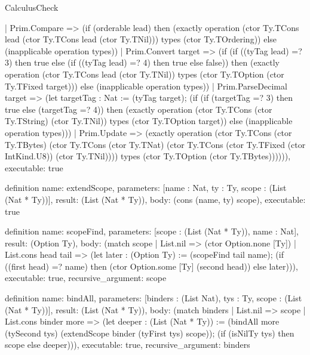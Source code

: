 \begin{lexlean}{CalculusCheck}
\begin{semanticmodule}
{    | Prim.Compare => (if (orderable lead) then (exactly operation (ctor Ty.TCons lead (ctor Ty.TCons lead (ctor Ty.TNil))) types (ctor Ty.TOrdering)) else (inapplicable operation types))
    | Prim.Convert target => (if (if ((tyTag lead) =? 3) then true else (if ((tyTag lead) =? 4) then true else false)) then (exactly operation (ctor Ty.TCons lead (ctor Ty.TNil)) types (ctor Ty.TOption (ctor Ty.TFixed target))) else (inapplicable operation types))
    | Prim.ParseDecimal target => (let targetTag : Nat := (tyTag target); (if (if (targetTag =? 3) then true else (targetTag =? 4)) then (exactly operation (ctor Ty.TCons (ctor Ty.TString) (ctor Ty.TNil)) types (ctor Ty.TOption target)) else (inapplicable operation types)))
    | Prim.Update => (exactly operation (ctor Ty.TCons (ctor Ty.TBytes) (ctor Ty.TCons (ctor Ty.TNat) (ctor Ty.TCons (ctor Ty.TFixed (ctor IntKind.U8)) (ctor Ty.TNil)))) types (ctor Ty.TOption (ctor Ty.TBytes)))))),
  executable: true
}

definition{
  name: extendScope,
  parameters: [name : Nat, ty : Ty, scope : (List (Nat * Ty))],
  result: (List (Nat * Ty)),
  body: (cons (name, ty) scope),
  executable: true
}

definition{
  name: scopeFind,
  parameters: [scope : (List (Nat * Ty)), name : Nat],
  result: (Option Ty),
  body: (match scope
    | List.nil => (ctor Option.none [Ty])
    | List.cons head tail => (let later : (Option Ty) := (scopeFind tail name); (if ((first head) =? name) then (ctor Option.some [Ty] (second head)) else later))),
  executable: true,
  recursive_argument: scope
}

definition{
  name: bindAll,
  parameters: [binders : (List Nat), tys : Ty, scope : (List (Nat * Ty))],
  result: (List (Nat * Ty)),
  body: (match binders
    | List.nil => scope
    | List.cons binder more => (let deeper : (List (Nat * Ty)) := (bindAll more (tySecond tys) (extendScope binder (tyFirst tys) scope)); (if (isNilTy tys) then scope else deeper))),
  executable: true,
  recursive_argument: binders
}


\end{semanticmodule}
\end{lexlean}
